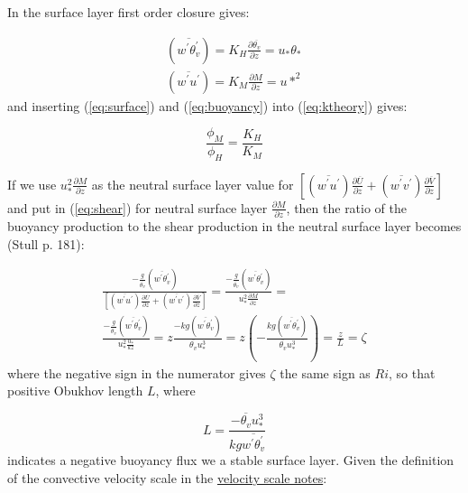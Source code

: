 \documentclass[11pt]{article}
\begin{document}
In the surface layer first order closure gives:

\begin{gather}
  \label{eq:ktheory}
   \left (\overline{ w^\prime \theta_v^\prime } \right ) = K_H \frac{\partial \overline{ \theta_v} }{\partial z} = u_* \theta_*\\
   \left (\overline{ w^\prime u^\prime } \right ) = K_M \frac{\partial M }{\partial z} = u*^2
\end{gather}
and inserting (\ref{eq:surface}) and (\ref{eq:buoyancy}) into (\ref{eq:ktheory}) gives:

\begin{equation}
  \label{eq:ksurface}
  \frac{\phi_M }{\phi_H} = \frac{K_H }{K_M} 
\end{equation}

If we use $u_*^2 \frac{ \partial  M}{\partial z} $ as the neutral surface
layer value for $\left [ \left ( \overline{ w^\prime u^\prime } \right ) \frac{ \partial \overline{ U}}{\partial z}   + 
\left (\overline{ w^\prime v^\prime }\right ) \frac{ \partial \overline{ V}}{\partial z}   \right ]$
and put in (\ref{eq:shear}) for neutral surface layer $\frac{ \partial  M}{\partial z}$, then the
ratio of the buoyancy production to the shear production in the neutral surface layer
becomes (Stull p. 181):

\begin{multline}
  \label{eq:rinew}
\frac{   - \frac{ g }{\overline{\theta_v}} \left ( \overline{ w^\prime \theta_v^\prime }   \right )  }%
{ \left [ \left ( \overline{ w^\prime u^\prime } \right ) \frac{ \partial \overline{ U}}{\partial z}   + 
\left (\overline{ w^\prime v^\prime }\right ) \frac{ \partial \overline{ V}}{\partial z}   \right ]}
= \frac{  -  \frac{ g }{\overline{\theta_v}} \left ( \overline{ w^\prime \theta_v^\prime }   \right )  }%
{u_*^2 \frac{ \partial  M}{\partial z}} =\\
 \frac{  -  \frac{ g }{\overline{\theta_v}} \left ( \overline{ w^\prime \theta_v^\prime }   \right )  }%
{u_*^2 \frac{u_* }{kz}}  = z \frac{- k g \left ( \overline{ w^\prime \theta_v^\prime }   \right ) }%
{\overline{\theta_v} u_*^3} =
  z \left ( -\frac{k g \left ( \overline{ w^\prime \theta_v^\prime }   \right ) }%
{\overline{\theta_v} u_*^3} \right ) 
=  \frac{ z}{L}  = \zeta
\end{multline}
where the negative sign in the numerator gives $\zeta$ the same sign as $Ri$, so that positive
Obukhov length $L$, where

\begin{equation}
  \label{eq:ol}
  L = \frac{-\overline{\theta_v} u_*^3 }{k g \overline{  w^\prime \theta_v^\prime }} 
\end{equation}
indicates a negative buoyancy flux  we
a stable surface layer.  Given the definition of the convective velocity scale
in the \href{http://clouds.eos.ubc.ca/~phil/courses/atsc500/docs/velocity_scales.pdf}{velocity scale notes}:
\end{document}
